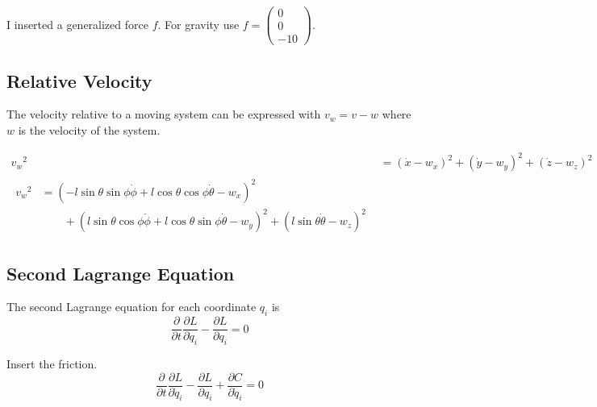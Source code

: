 \documentclass{scrartcl}
\begin{document}
I inserted a generalized force $f$. For gravity use $f = \left(\begin{smallmatrix}0\\0\\-10\end{smallmatrix}\right)$.

\subsection {Relative Velocity}
\label{ssec:rvelocity}
The velocity relative to a moving system can be expressed with $v_w = v - w$ where $w$ is the velocity of the system.

\begin{align}
  {v_w}^2& = (\dot{x} - w_x)^2 + (\dot{y} - w_y)^2 + (\dot{z} - w_z)^2 \\
  \begin{split}
  {v_w}^2 &= 
      (-l \sin{\theta} \sin{\phi} \dot{\phi} + l \cos{\theta}\cos{\phi} \dot{\theta} - w_x)^2 
      \\ &\qquad + (l \sin{\theta} \cos\phi \dot{\phi} + l \cos\theta\sin{\phi} \dot{\theta} - w_y)^2
    + (l \sin\theta \dot{\theta} - w_z)^2 
  \end{split}
\end{align}








\subsection{Second Lagrange Equation}

The second Lagrange equation for each coordinate $q_i$ is
\begin{equation}
\frac{\partial }{\partial t} \frac{\partial L}{\partial \dot{q}_i} - \frac{\partial L}{\partial q_i} = 0
\end{equation}

Insert the friction.
\begin{equation}
\frac{\partial }{\partial t} \frac{\partial L}{\partial \dot{q}_i}
- \frac{\partial L}{\partial q_i}
+ \frac{\partial C}{\partial \dot{q}_i}
= 0
\end{equation}
\end{document}

